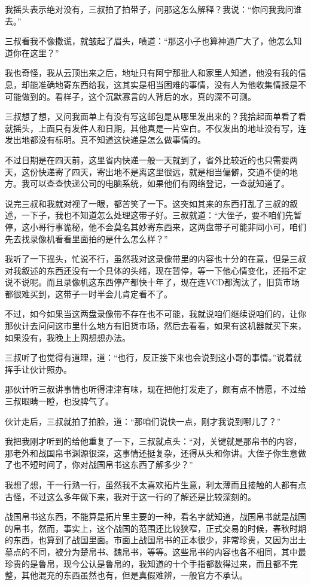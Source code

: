 我摇头表示绝对没有，三叔拍了拍带子，问那这怎么解释？我说：“你问我我问谁去。”

三叔看我不像撒谎，就皱起了眉头，啧道：“那这小子也算神通广大了，他怎么知道你在这里？”

我也奇怪，我从云顶出来之后，地址只有阿宁那批人和家里人知道，他没有我的信息，却能准确地寄东西给我，这其实是相当困难的事情，没有人为他收集情报是不可能做到的。看样子，这个沉默寡言的人背后的水，真的深不可测。

三叔想了想，又问我面单上有没有写这邮包是从哪里发出来的？我拾起面单看了看就摇头，上面只有发件人和日期，其他真是一片空白。不仅发出的地址没有写，连发出地都没有标明。真不知道这快递是怎么做事情的。

不过日期是在四天前，这里省内快递一般一天就到了，省外比较近的也只需要两天，这份快递寄了四天，寄出地不是离这里很远，就是相当偏僻，交通不便的地方。我可以查查快递公司的电脑系统，如果他们有网络登记，一查就知道了。

说完三叔和我就对视了一眼，都苦笑了一下。这突如其来的东西打乱了三叔的叙述，一下子，我也不知道怎么处理这带子好。三叔就道：“大侄子，要不咱们先暂停，这小哥行事诡秘，他不会莫名其妙寄东西来，这两盘带子可能非同小可，咱们先去找录像机看看里面拍的是什么怎么样？”

我听了一下摇头，忙说不行，虽然我对这录像带里的内容也十分的在意，但是三叔对我叙述的东西还没有一个具体的头绪，现在暂停，等一下他心情变化，还指不定说不说呢。而且录像机这东西停产都快十年了，现在连VCD都淘汰了，旧货市场都很难买到，这带子一时半会儿肯定看不了。

不过，如今如果当这两盘录像带不存在也不可能，我就说咱们继续说咱们的，让你那伙计去问问这市里什么地方有旧货市场，然后去看看，如果有这机器就买下来，如果没有，我晚上上网想想办法。

三叔听了也觉得有道理，道：“也行，反正接下来也会说到这小哥的事情。”说着就挥手让伙计照办。

那伙计听三叔讲事情也听得津津有味，现在把他打发走了，颇有点不情愿，不过给三叔眼睛一瞪，也没脾气了。

伙计走后，三叔就拍了拍脸，道：“那咱们说快一点，刚才我说到哪儿了？”

我把我刚才听到的给他重复了一下，三叔就点头：“对，关键就是那帛书的内容，那老外和战国帛书渊源很深，这事情还挺复杂，还得从头和你讲。大侄子你生意做了也不短时间了，你对战国帛书这东西了解多少？”

我想了想，干一行熟一行，虽然我不太喜欢拓片生意，利太薄而且接触的人都有点古怪，不过这么多年做下来，我对于这一行的了解还是比较深刻的。

战国帛书这东西，不能算是拓片里主要的一种，看名字就知道，战国帛书就是战国的帛书，然而，事实上，这个战国的范围还比较狭窄，正式交易的时候，春秋时期的东西，也算到了战国里面。市面上战国帛书的正本很少，非常珍贵，又因为出土墓点的不同，被分为楚帛书、魏帛书，等等。这些帛书的内容也各不相同，其中最珍贵的是鲁帛，现今公认是鲁帛的，我知道的十个手指都数得过来，而且都不完整，其他混充的东西虽然也有，但是真假难辨，一般官方不承认。

